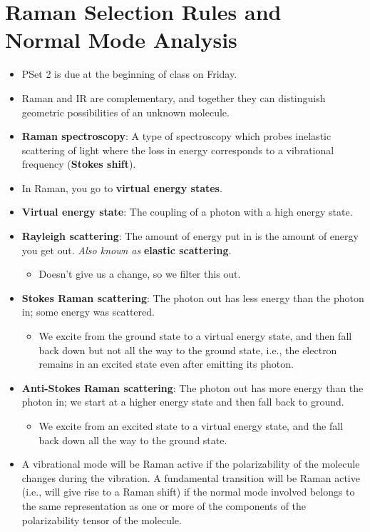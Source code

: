 \documentclass[../notes.tex]{subfiles}
\begin{document}
\section{Raman Selection Rules and Normal Mode Analysis}
\begin{itemize}
    \item {}PSet 2 is due at the beginning of class on Friday.
    \item Raman and IR are complementary, and together they can distinguish geometric possibilities of an unknown molecule.
    \item \textbf{Raman spectroscopy}: A type of spectroscopy which probes inelastic scattering of light where the loss in energy corresponds to a vibrational frequency (\textbf{Stokes shift}).
    \item In Raman, you go to \textbf{virtual energy states}.
    \item \textbf{Virtual energy state}: The coupling of a photon with a high energy state.
    \item \textbf{Rayleigh scattering}: The amount of energy put in is the amount of energy you get out. \emph{Also known as} \textbf{elastic scattering}.
    \begin{itemize}
        \item Doesn't give us a change, so we filter this out.
    \end{itemize}
    \item \textbf{Stokes Raman scattering}: The photon out has less energy than the photon in; some energy was scattered.
    \begin{itemize}
        \item We excite from the ground state to a virtual energy state, and then fall back down but not all the way to the ground state, i.e., the electron remains in an excited state even after emitting its photon.
    \end{itemize}
    \item \textbf{Anti-Stokes Raman scattering}: The photon out has more energy than the photon in; we start at a higher energy state and then fall back to ground.
    \begin{itemize}
        \item We excite from an excited state to a virtual energy state, and the fall back down all the way to the ground state.
    \end{itemize}
    \item A vibrational mode will be Raman active if the polarizability of the molecule changes during the vibration. A fundamental transition will be Raman active (i.e., will give rise to a Raman shift) if the normal mode involved belongs to the same representation as one or more of the components of the polarizability tensor of the molecule.

\end{itemize}
\end{document}
